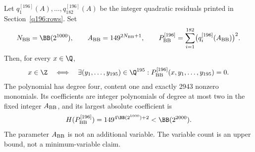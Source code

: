 \begin{theorem}\label{q196:fixed}
Let $q_1^{[196]}(A),\ldots,q_{182}^{[196]}(A)$ be the integer
quadratic residuals printed in Section~\ref{q196:rows}. Set
\[
 N_{\rm BB}=\BB(2^{1000}),\qquad
 A_{\rm BB}=149^{2N_{\rm BB}+1},\qquad
 P_{\rm BB}^{[196]}=\sum_{i=1}^{182}\bigl(q_i^{[196]}(A_{\rm BB})\bigr)^2.
\]
Then, for every $x\in\Q$,
\[
 x\in\Z\quad\Longleftrightarrow\quad
 \exists(y_1,\ldots,y_{195})\in\Q^{195}:
 P_{\rm BB}^{[196]}(x,y_1,\ldots,y_{195})=0.
\]
The polynomial has degree four, content one and exactly 2943 nonzero
monomials. Its coefficients are integer polynomials of degree at most two
in the fixed integer $A_{\rm BB}$, and its largest absolute coefficient is
\[
 H(P_{\rm BB}^{[196]})=149^{4\BB(2^{1000})+2}<\BB(2^{2000}).
\]
The parameter $A_{\rm BB}$ is not an additional variable. The variable
count is an upper bound, not a minimum-variable claim.
\end{theorem}
